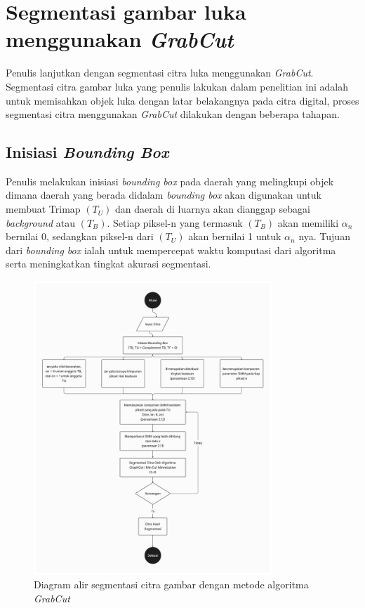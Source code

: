 \section{Segmentasi gambar luka menggunakan \emph{GrabCut}}

Penulis lanjutkan dengan segmentasi citra luka menggunakan \emph{GrabCut}. Segmentasi
citra gambar luka yang penulis lakukan dalam penelitian ini adalah untuk memisahkan
objek luka dengan latar belakangnya pada citra digital, proses segmentasi citra menggunakan
\emph{GrabCut} dilakukan dengan beberapa tahapan. 

\subsection{Inisiasi \emph{Bounding Box}}
Penulis melakukan inisiasi \emph{bounding box} pada daerah yang melingkupi objek 
dimana daerah yang berada didalam \emph{bounding box} akan digunakan untuk membuat 
Trimap \((T_{U})\) dan daerah di luarnya akan dianggap sebagai \emph{background} 
atau \((T_{B})\). Setiap piksel-n yang termasuk \((T_{B})\) akan memiliki \(\alpha_{n}\) 
bernilai 0, sedangkan piksel-n dari \((T_{U})\) akan bernilai 1 untuk \(\alpha_{n}\) nya. 
Tujuan dari \emph{bounding box} ialah untuk mempercepat waktu komputasi dari 
algoritma serta meningkatkan tingkat akurasi segmentasi.

\begin{figure}[H]
	\centering{}
	\includegraphics[width=0.8\textwidth]{gambar/gambar-3_6.png}
	\caption{Diagram alir segmentasi citra gambar dengan metode algoritma \emph{GrabCut}}
\end{figure}


